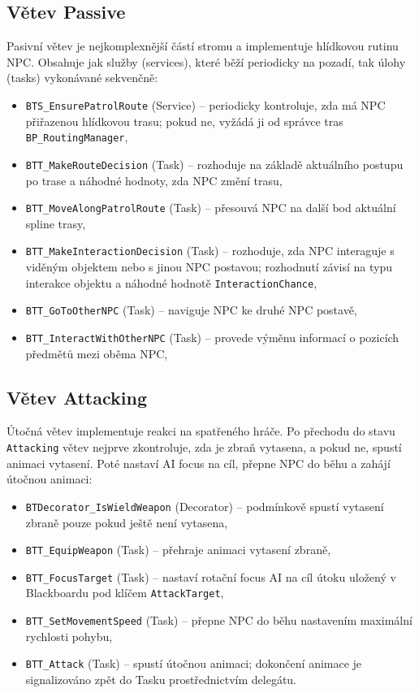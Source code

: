 \subsection{Větev Passive}

Pasivní větev je nejkomplexnější částí stromu a implementuje hlídkovou rutinu NPC. 
Obsahuje jak služby (services), které běží periodicky na pozadí, tak úlohy (tasks) vykonávané sekvenčně:

\begin{itemize}
    \item \texttt{BTS\_EnsurePatrolRoute} (Service) -- periodicky kontroluje, zda má NPC přiřazenou hlídkovou trasu; pokud ne, vyžádá ji od správce tras \texttt{BP\_RoutingManager},
    \item \texttt{BTT\_MakeRouteDecision} (Task) -- rozhoduje na základě aktuálního postupu po trase a náhodné hodnoty, zda NPC změní trasu,
    \item \texttt{BTT\_MoveAlongPatrolRoute} (Task) -- přesouvá NPC na další bod aktuální spline trasy,
    \item \texttt{BTT\_MakeInteractionDecision} (Task) -- rozhoduje, zda NPC interaguje s viděným objektem nebo s jinou NPC postavou; rozhodnutí závisí na typu interakce objektu a náhodné hodnotě \texttt{InteractionChance},
    \item \texttt{BTT\_GoToOtherNPC} (Task) -- naviguje NPC ke druhé NPC postavě,
    \item \texttt{BTT\_InteractWithOtherNPC} (Task) -- provede výměnu informací o pozicích předmětů mezi oběma NPC,
\end{itemize}

\subsection{Větev Attacking}

Útočná větev implementuje reakci na spatřeného hráče. 
Po přechodu do stavu \texttt{Attacking} větev nejprve zkontroluje, zda je zbraň vytasena, a pokud ne, spustí animaci vytasení. 
Poté nastaví AI focus na cíl, přepne NPC do běhu a zahájí útočnou animaci:

\begin{itemize}
    \item \texttt{BTDecorator\_IsWieldWeapon} (Decorator) -- podmínkově spustí vytasení zbraně pouze pokud ještě není vytasena,
    \item \texttt{BTT\_EquipWeapon} (Task) -- přehraje animaci vytasení zbraně,
    \item \texttt{BTT\_FocusTarget} (Task) -- nastaví rotační focus AI na cíl útoku uložený v Blackboardu pod klíčem \texttt{AttackTarget},
    \item \texttt{BTT\_SetMovementSpeed} (Task) -- přepne NPC do běhu nastavením maximální rychlosti pohybu,
    \item \texttt{BTT\_Attack} (Task) -- spustí útočnou animaci; dokončení animace je signalizováno zpět do Tasku prostřednictvím delegátu.
\end{itemize}

